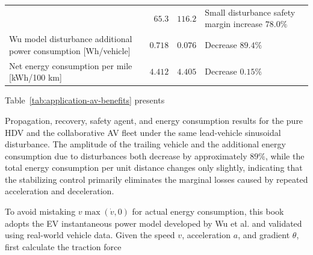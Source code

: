 \documentclass[11pt,a4paper,openany]{book}
\numberwithin{equation}{chapter}
\numberwithin{figure}{chapter}
\numberwithin{table}{chapter}
\newcommand{\tabletext}[2]{%
  \par\smallskip\noindent
  Table~\ref{#1} presents #2
\par\smallskip
}
\begin{document}
\begin{center}
\begin{tabular}{p{4.2cm}rrp{4.4cm}}
& $65.3$ & $116.2$ &




 Small disturbance safety margin increase $78.0\%$



\\







Wu model disturbance additional power consumption [Wh/vehicle]




& $0.718$ & $0.076$ &




 Decrease $89.4\%$



\\







Net energy consumption per mile [kWh/100 km]




& $4.412$ & $4.405$ &




 Decrease $0.15\%$



\\
\bottomrule
\end{tabular}
\end{center}
\tabletext{tab:application-av-benefits}{




Propagation, recovery, safety agent, and energy consumption results for the pure HDV and the collaborative AV fleet under the same lead-vehicle sinusoidal disturbance. The amplitude of the trailing vehicle and the additional energy consumption due to disturbances both decrease by approximately $89\%$, while the total energy consumption per unit distance changes only slightly, indicating that the stabilizing control primarily eliminates the marginal losses caused by repeated acceleration and deceleration.}





To avoid mistaking $v\max(\dot v,0)$ for actual energy consumption, this book adopts the EV instantaneous power model \cite{wu2015ev} developed by Wu et al. and validated using real-world vehicle data. Given the speed $v$, acceleration $a$, and gradient $\theta$, first calculate the traction force
\end{document}
